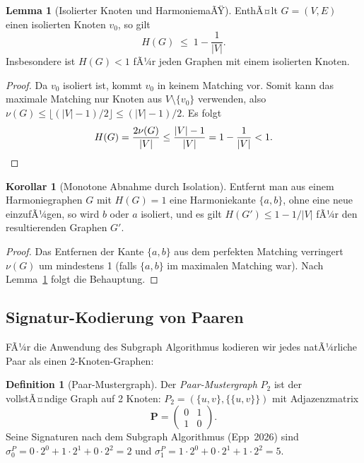 ﻿\documentclass[a4paper,12pt]{article}
\theoremstyle{definition}
\newtheorem{definition}{Definition}
\newtheorem{lemma}{Lemma}
\newtheorem{korollar}{Korollar}
\begin{document}
\begin{lemma}[Isolierter Knoten und HarmoniemaÃŸ]
	\label{lem:isoliert}
	EnthÃ¤lt $G = (V, E)$ einen isolierten Knoten $v_0$, so gilt
	\[
		H(G) \;\leq\; 1 - \frac{1}{|V|}.
	\]
	Insbesondere ist $H(G) < 1$ fÃ¼r jeden Graphen mit einem isolierten Knoten.
\end{lemma}

\begin{proof}
	Da $v_0$ isoliert ist, kommt $v_0$ in keinem Matching vor.
	Somit kann das maximale Matching nur Knoten aus $V \setminus \{v_0\}$ verwenden,
	also $\nu(G) \leq \lfloor (|V|-1)/2 \rfloor \leq (|V|-1)/2$.
	Es folgt
	\[
		H(G) = \frac{2\nu(G)}{|V|} \leq \frac{|V|-1}{|V|} = 1 - \frac{1}{|V|} < 1.\qedhere
	\]
\end{proof}

\begin{korollar}[Monotone Abnahme durch Isolation]
	Entfernt man aus einem Harmoniegraphen $G$ mit $H(G) = 1$ eine Harmoniekante
	$\{a, b\}$, ohne eine neue einzufÃ¼gen, so wird $b$ oder $a$ isoliert, und es gilt
	$H(G') \leq 1 - 1/|V|$ fÃ¼r den resultierenden Graphen $G'$.
\end{korollar}

\begin{proof}
	Das Entfernen der Kante $\{a,b\}$ aus dem perfekten Matching verringert $\nu(G)$
	um mindestens 1 (falls $\{a,b\}$ im maximalen Matching war). Nach Lemma~\ref{lem:isoliert}
	folgt die Behauptung.
\end{proof}

\subsection{Signatur-Kodierung von Paaren}

FÃ¼r die Anwendung des Subgraph Algorithmus kodieren wir jedes natÃ¼rliche Paar
als einen 2-Knoten-Graphen:

\begin{definition}[Paar-Mustergraph]
	Der \emph{Paar-Mustergraph} $P_2$ ist der vollstÃ¤ndige Graph auf 2 Knoten:
	$P_2 = (\{u, v\}, \{\{u,v\}\})$ mit Adjazenzmatrix
	\[
		\mathbf{P} = \begin{pmatrix} 0 & 1 \\ 1 & 0 \end{pmatrix}.
	\]
	Seine Signaturen nach dem Subgraph Algorithmus (Epp~2026) sind
	$\sigma_0^P = 0\cdot2^0 + 1\cdot2^1 + 0\cdot2^2 = 2$ und
	$\sigma_1^P = 1\cdot2^0 + 0\cdot2^1 + 1\cdot2^2 = 5$.
\end{definition}
\end{document}

